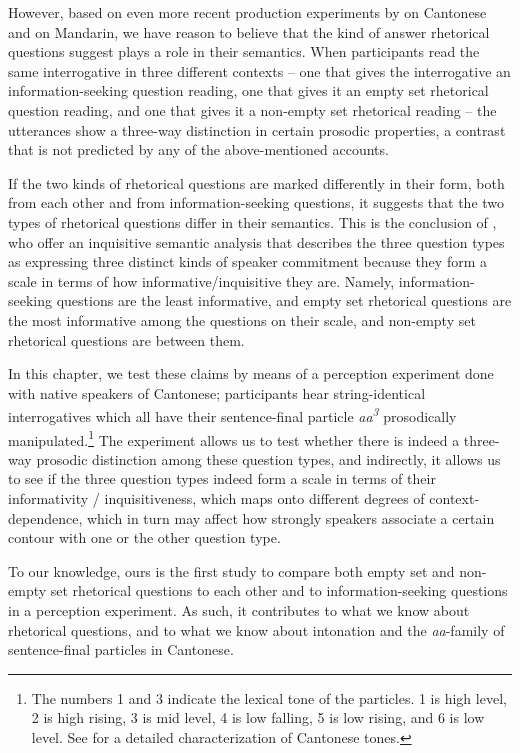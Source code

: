 \documentclass[output=paper,colorlinks,citecolor=brown            ,chinesefont]{langscibook}
\begin{document}
However, based on even more recent production experiments by \citet{Lo+2019} on Cantonese and \citet{Lo+2020} on Mandarin, we have reason to believe that the kind of answer rhetorical questions suggest plays a role in their semantics. When participants read the same interrogative in three different contexts -- one that gives the interrogative an information-seeking question reading, one that gives it an empty set rhetorical question reading, and one that gives it a non-empty set rhetorical reading -- the utterances show a three-way distinction in certain prosodic properties, a contrast that is not predicted by any of the above-mentioned accounts.

If the two kinds of rhetorical questions are marked differently in their form, both from each other and from information-seeking questions, it suggests that the two types of rhetorical questions differ in their semantics. This is the conclusion of \citet{Kiss+2021}, who offer an inquisitive semantic analysis that describes the three question types as expressing three distinct kinds of speaker commitment because they form a scale in terms of how informative/inquisitive they are. Namely, information-seeking questions are the least informative, and empty set rhetorical questions are the most informative among the questions on their scale, and non-empty set rhetorical questions are between them.

In this chapter, we test these claims by means of a perception experiment done with native speakers of Cantonese; participants hear string-identical interrogatives which all have their sentence-final particle \textit{aa\textsuperscript{3}} prosodically manipulated.\footnote{The numbers 1 and 3 indicate the lexical tone of the particles. 1 is high level, 2 is high rising, 3 is mid level, 4 is low falling, 5 is low rising, and 6 is low level. See \citet{Matthews+2011} for a detailed characterization of Cantonese tones.} The experiment allows us to test whether there is indeed a three-way prosodic distinction among these question types, and indirectly, it allows us to see if the three question types indeed form a scale in terms of their informativity / inquisitiveness, which maps onto different degrees of context-dependence, which in turn may affect how strongly speakers associate a certain contour with one or the other question type.

To our knowledge, ours is the first study to compare both empty set and non-empty set rhetorical questions to each other and to information-seeking questions in a perception experiment. As such, it contributes to what we know about rhetorical questions, and to what we know about intonation and the \textit{aa}-family of sentence-final particles in Cantonese.
\end{document}
